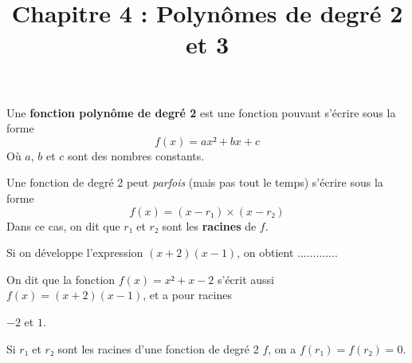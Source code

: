 \documentclass[
	classe=$1^{ere}STI2D$,
]{coursclass}
\title{Chapitre 4 : Polynômes de degré 2 et 3}
\date{}
\begin{document}
\maketitle

\begin{definition}
	Une \textbf{fonction polynôme de degré 2} est une fonction pouvant s'écrire sous la forme
	$$ f(x) = ax² + bx + c $$
	Où $a$, $b$ et $c$ sont des nombres constants.
\end{definition}

\begin{definition}[Racines]
	Une fonction de degré 2 peut \textit{parfois} (mais pas tout le temps) s'écrire sous la forme
	$$ f(x) = (x - r₁) × (x - r₂) $$
	Dans ce cas, on dit que $r₁$ et $r₂$ sont les \textbf{racines} de $f$.
\end{definition}

\begin{exemple}
	Si on développe l'expression $(x + 2)(x - 1)$, on obtient $............$.

	On dit que la fonction $f(x) = x² + x - 2$ s'écrit aussi $f(x) = (x + 2)(x - 1)$, et a pour racines

	$-2$ et $1$.
\end{exemple}

\begin{propriete}
	Si $r₁$ et $r₂$ sont les racines d'une fonction de degré 2 $f$, on a $f(r₁) = f(r₂) = 0$.
\end{propriete}
\end{document}
